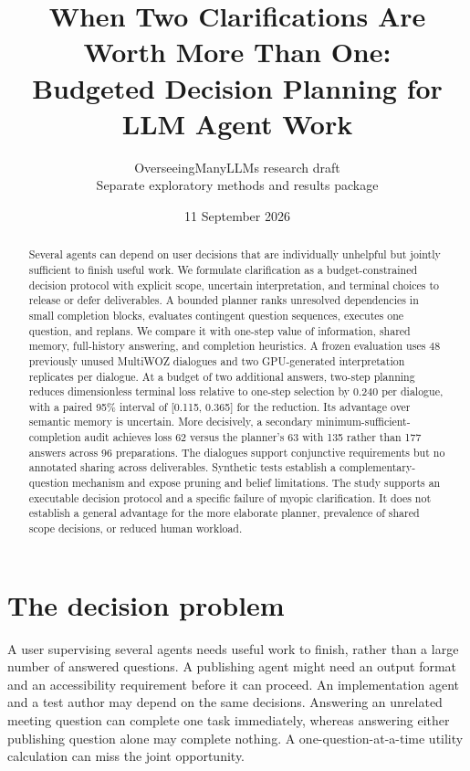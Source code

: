 \documentclass[11pt]{article}
\title{When Two Clarifications Are Worth More Than One:\\Budgeted Decision Planning for LLM Agent Work}
\author{OverseeingManyLLMs research draft\\\small Separate exploratory methods and results package}
\date{11 September 2026}
\begin{document}
\maketitle
\begin{abstract}
Several agents can depend on user decisions that are individually unhelpful but jointly sufficient to finish useful work. We formulate clarification as a budget-constrained decision protocol with explicit scope, uncertain interpretation, and terminal choices to release or defer deliverables. A bounded planner ranks unresolved dependencies in small completion blocks, evaluates contingent question sequences, executes one question, and replans. We compare it with one-step value of information, shared memory, full-history answering, and completion heuristics. A frozen evaluation uses 48 previously unused MultiWOZ dialogues and two GPU-generated interpretation replicates per dialogue. At a budget of two additional answers, two-step planning reduces dimensionless terminal loss relative to one-step selection by 0.240 per dialogue, with a paired 95\% interval of [0.115, 0.365] for the reduction. Its advantage over semantic memory is uncertain. More decisively, a secondary minimum-sufficient-completion audit achieves loss 62 versus the planner's 63 with 135 rather than 177 answers across 96 preparations. The dialogues support conjunctive requirements but no annotated sharing across deliverables. Synthetic tests establish a complementary-question mechanism and expose pruning and belief limitations. The study supports an executable decision protocol and a specific failure of myopic clarification. It does not establish a general advantage for the more elaborate planner, prevalence of shared scope decisions, or reduced human workload.
\end{abstract}

\section{The decision problem}
A user supervising several agents needs useful work to finish, rather than a large number of answered questions. A publishing agent might need an output format and an accessibility requirement before it can proceed. An implementation agent and a test author may depend on the same decisions. Answering an unrelated meeting question can complete one task immediately, whereas answering either publishing question alone may complete nothing. A one-question-at-a-time utility calculation can miss the joint opportunity.
\end{document}
